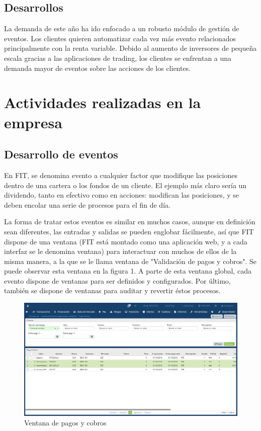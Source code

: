 \documentclass[titlepage]{article}
\begin{document}
\subsection{Desarrollos}
La demanda de este año ha ido enfocado a un robusto módulo de gestión de eventos. Los clientes quieren automatizar cada vez más evento relacionados principalmente con la renta variable. Debido al aumento de inversores de pequeña escala gracias a las aplicaciones de trading, los clientes se enfrentan a una demanda mayor de eventos sobre las acciones de los clientes.


\newpage

\section{Actividades realizadas en la empresa}
\subsection{Desarrollo de eventos}
En FIT, se denomina evento a cualquier factor que modifique las posiciones dentro de una cartera o los fondos de un cliente. El ejemplo más claro sería un dividendo, tanto en efectivo como en acciones: modifican las posiciones, y se deben encolar una serie de procesos para el fin de día.\par

La forma de tratar estos eventos es similar en muchos casos, aunque en definición sean diferentes, las entradas y salidas se pueden englobar fácilmente, así que FIT dispone de una ventana (FIT está montado como una aplicación web, y a cada interfaz se le denomina ventana) para interactuar con muchos de ellos de la misma manera, a la que se le llama ventana de "Validación de pagos y cobros". Se puede observar esta ventana en la figura 1. A parte de esta ventana global, cada evento dispone de ventanas para ser definidos y configurados. Por último, también se dispone de ventanas para auditar y revertir éstos procesos.\par

\begin{figure}[h]
\centering
\includegraphics[width=\textwidth]{auditoria}
\caption{Ventana de pagos y cobros}
\end{figure}
\end{document}
